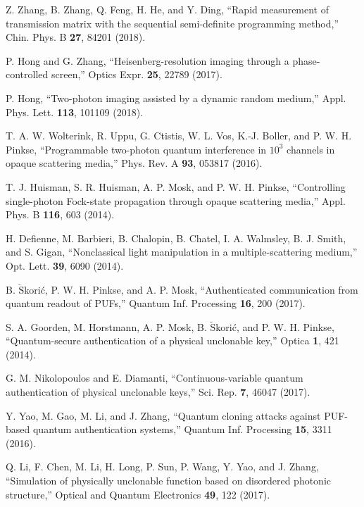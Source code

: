 \documentclass[9pt,twocolumn,twoside]{osajnl}
\begin{document}
\begin{thebibliography}{99}
 Z. Zhang, B. Zhang, Q. Feng, H. He, and Y. Ding, \enquote{Rapid measurement of transmission matrix with the sequential semi-definite programming method,} Chin. Phys. B \textbf{27}, 84201 (2018).

 P. Hong and G. Zhang, \enquote{Heisenberg-resolution imaging through a phase-controlled screen,} Optics Expr. \textbf{25}, 22789 (2017).

 P. Hong, \enquote{Two-photon imaging assisted by a dynamic random medium,} Appl. Phys. Lett. \textbf{113}, 101109 (2018).


 T. A. W. Wolterink, R. Uppu, G. Ctistis, W. L. Vos, K.-J. Boller, and P. W. H. Pinkse, \enquote{Programmable two-photon quantum interference in $10^3$ channels in opaque scattering media,} Phys. Rev. A \textbf{93}, 053817 (2016).

 T. J. Huisman, S. R. Huisman, A. P. Mosk, and P. W. H. Pinkse, \enquote{Controlling single-photon Fock-state propagation through opaque scattering media,} Appl. Phys. B \textbf{116}, 603 (2014).

 H. Defienne, M. Barbieri, B. Chalopin, B. Chatel, I. A. Walmsley, B. J. Smith, and S. Gigan, \enquote{Nonclassical light manipulation in a multiple-scattering medium,} Opt. Lett. \textbf{39}, 6090 (2014).

 B. $\breve{\text{S}}$kori\'{c}, P. W. H. Pinkse, and A. P. Mosk, \enquote{Authenticated communication from quantum readout of PUFs,} Quantum Inf. Processing \textbf{16}, 200 (2017).


 S. A. Goorden, M. Horstmann, A. P. Mosk, B. $\breve{\text{S}}$kori\'c, and P. W. H. Pinkse, \enquote{Quantum-secure authentication of a physical unclonable key,} Optica \textbf{1}, 421 (2014).

 G. M. Nikolopoulos and E. Diamanti, \enquote{Continuous-variable quantum authentication of physical unclonable keys,} Sci. Rep. \textbf{7}, 46047 (2017).

 Y. Yao, M. Gao, M. Li, and J. Zhang, \enquote{Quantum cloning attacks against PUF-based quantum authentication systems,} Quantum Inf. Processing \textbf{15}, 3311 (2016).

 Q. Li, F. Chen, M. Li, H. Long, P. Sun, P. Wang, Y. Yao, and J. Zhang, \enquote{Simulation of physically unclonable function based on disordered photonic structure,} Optical and Quantum Electronics \textbf{49}, 122 (2017).


\end{thebibliography}
\end{document}
